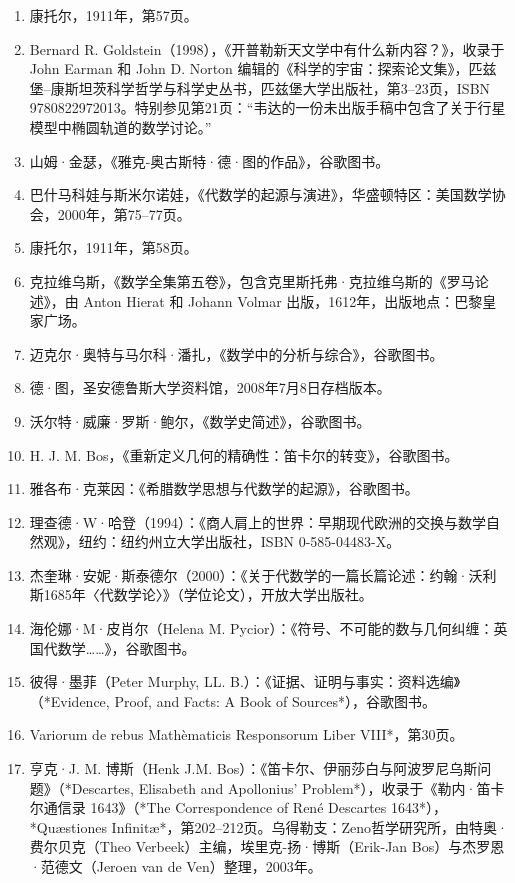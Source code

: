 \begin{enumerate}
\item 康托尔，1911年，第57页。
\item Bernard R. Goldstein（1998），《开普勒新天文学中有什么新内容？》，收录于 John Earman 和 John D. Norton 编辑的《科学的宇宙：探索论文集》，匹兹堡–康斯坦茨科学哲学与科学史丛书，匹兹堡大学出版社，第3–23页，ISBN 9780822972013。特别参见第21页：“韦达的一份未出版手稿中包含了关于行星模型中椭圆轨道的数学讨论。”
\item 山姆·金瑟，《雅克-奥古斯特·德·图的作品》，谷歌图书。
\item 巴什马科娃与斯米尔诺娃，《代数学的起源与演进》，华盛顿特区：美国数学协会，2000年，第75–77页。
\item 康托尔，1911年，第58页。
\item 克拉维乌斯，《数学全集第五卷》，包含克里斯托弗·克拉维乌斯的《罗马论述》，由 Anton Hierat 和 Johann Volmar 出版，1612年，出版地点：巴黎皇家广场。
\item 迈克尔·奥特与马尔科·潘扎，《数学中的分析与综合》，谷歌图书。
\item 德·图，圣安德鲁斯大学资料馆，2008年7月8日存档版本。
\item 沃尔特·威廉·罗斯·鲍尔，《数学史简述》，谷歌图书。
\item H. J. M. Bos，《重新定义几何的精确性：笛卡尔的转变》，谷歌图书。
\item 雅各布·克莱因：《希腊数学思想与代数学的起源》，谷歌图书。
\item 理查德·W·哈登（1994）：《商人肩上的世界：早期现代欧洲的交换与数学自然观》，纽约：纽约州立大学出版社，ISBN 0-585-04483-X。
\item 杰奎琳·安妮·斯泰德尔（2000）：《关于代数学的一篇长篇论述：约翰·沃利斯1685年〈代数学论〉》（学位论文），开放大学出版社。
\item 海伦娜·M·皮肖尔（Helena M. Pycior）：《符号、不可能的数与几何纠缠：英国代数学……》，谷歌图书。

\item 彼得·墨菲（Peter Murphy, LL. B.）：《证据、证明与事实：资料选编》（*Evidence, Proof, and Facts: A Book of Sources*），谷歌图书。

\item Variorum de rebus Mathèmaticis Responsorum Liber VIII*，第30页。
\item 亨克·J. M. 博斯（Henk J.M. Bos）：《笛卡尔、伊丽莎白与阿波罗尼乌斯问题》（*Descartes, Elisabeth and Apollonius’ Problem*），收录于《勒内·笛卡尔通信录 1643》（*The Correspondence of René Descartes 1643*），*Quæstiones Infinitæ*，第202–212页。乌得勒支：Zeno哲学研究所，由特奥·费尔贝克（Theo Verbeek）主编，埃里克-扬·博斯（Erik-Jan Bos）与杰罗恩·范德文（Jeroen van de Ven）整理，2003年。


\end{enumerate}
